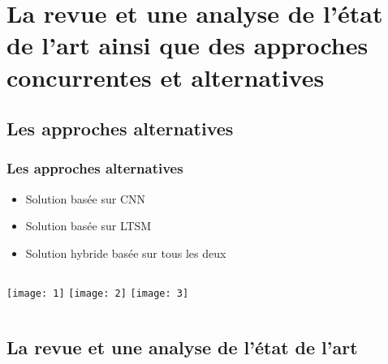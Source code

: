 \documentclass{beamer}
\begin{document}
	\section{La revue et une analyse de l’état de l’art ainsi que des approches concurrentes et alternatives}
	

\subsection{Les approches alternatives}

\begin{frame}
	\frametitle{Les approches alternatives}
	\begin{itemize}
		\item Solution basée sur CNN
		\item Solution basée sur LTSM
		\item Solution hybride basée sur tous les deux
	\end{itemize}

		\begin{columns}[c]
		\centering
		\texttt{[image: 1]}
		\centering
		\texttt{[image: 2]}
		\centering
		\texttt{[image: 3]}
	\end{columns}

\end{frame}

%	
%	
\subsection{La revue et une analyse de l’état de l’art}
\end{document}
